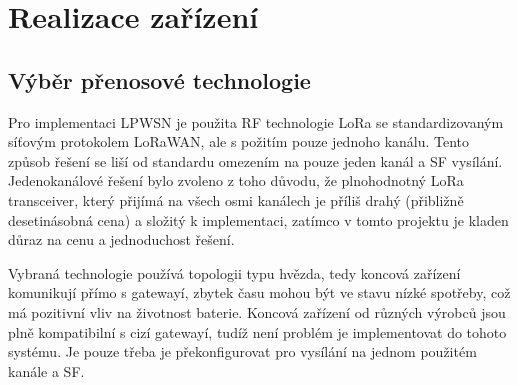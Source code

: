 \chapter{Realizace zařízení}

\section{Výběr přenosové technologie}
Pro implementaci LPWSN je použita RF technologie LoRa se standardizovaným síťovým protokolem LoRaWAN, ale s požitím pouze jednoho kanálu.
Tento způsob řešení se liší od standardu omezením na pouze jeden kanál a SF vysílání.
Jedenokanálové řešení bylo zvoleno z toho důvodu, že plnohodnotný LoRa transceiver, který přijímá na všech osmi kanálech je příliš drahý (přibližně desetinásobná cena) a složitý k implementaci, zatímco v tomto projektu je kladen důraz na cenu a jednoduchost řešení.

Vybraná technologie používá topologii typu hvězda, tedy koncová zařízení komunikují přímo s gatewayí, 
zbytek času mohou být ve stavu nízké spotřeby, což má pozitivní vliv na životnost baterie.
Koncová zařízení od různých výrobců jsou plně kompatibilní s cizí gatewayí, tudíž není problém je implementovat do tohoto systému. 
Je pouze třeba je překonfigurovat pro vysílání na jednom použitém kanále a SF.



